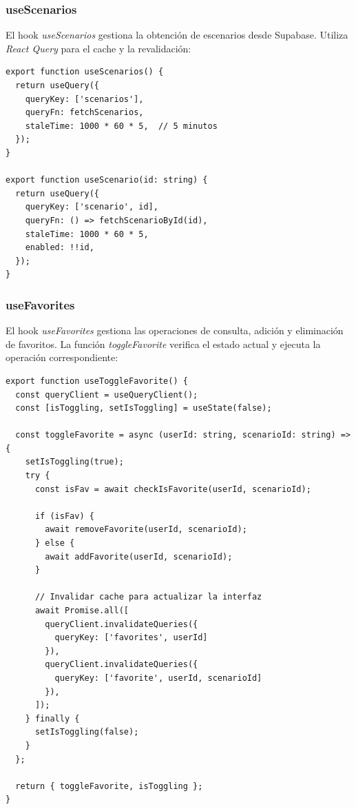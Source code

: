 \subsubsection{useScenarios}

El hook \textit{useScenarios} gestiona la obtenci\'on de escenarios desde
Supabase. Utiliza \textit{React Query} para el cache y la revalidaci\'on:

\begin{lstlisting}
export function useScenarios() {
  return useQuery({
    queryKey: ['scenarios'],
    queryFn: fetchScenarios,
    staleTime: 1000 * 60 * 5,  // 5 minutos
  });
}

export function useScenario(id: string) {
  return useQuery({
    queryKey: ['scenario', id],
    queryFn: () => fetchScenarioById(id),
    staleTime: 1000 * 60 * 5,
    enabled: !!id,
  });
}
\end{lstlisting}

\subsubsection{useFavorites}

El hook \textit{useFavorites} gestiona las operaciones de consulta,
adici\'on y eliminaci\'on de favoritos. La funci\'on \textit{toggleFavorite}
verifica el estado actual y ejecuta la operaci\'on correspondiente:

\begin{lstlisting}
export function useToggleFavorite() {
  const queryClient = useQueryClient();
  const [isToggling, setIsToggling] = useState(false);

  const toggleFavorite = async (userId: string, scenarioId: string) => {
    setIsToggling(true);
    try {
      const isFav = await checkIsFavorite(userId, scenarioId);

      if (isFav) {
        await removeFavorite(userId, scenarioId);
      } else {
        await addFavorite(userId, scenarioId);
      }

      // Invalidar cache para actualizar la interfaz
      await Promise.all([
        queryClient.invalidateQueries({
          queryKey: ['favorites', userId]
        }),
        queryClient.invalidateQueries({
          queryKey: ['favorite', userId, scenarioId]
        }),
      ]);
    } finally {
      setIsToggling(false);
    }
  };

  return { toggleFavorite, isToggling };
}
\end{lstlisting}
